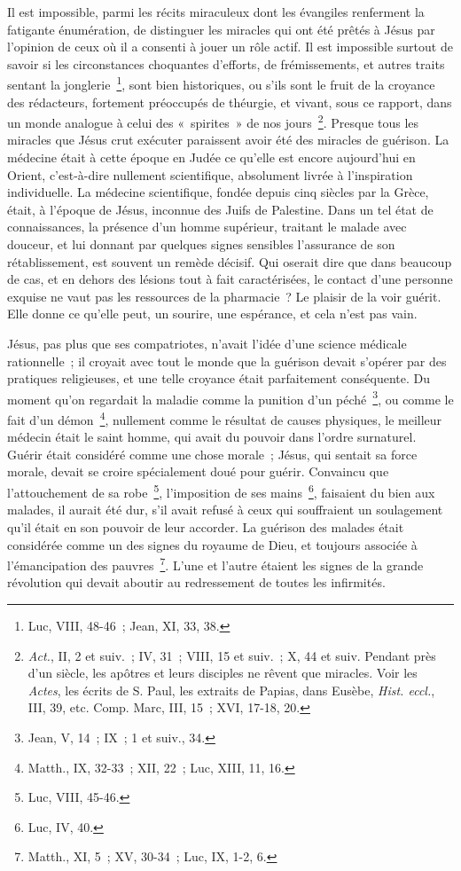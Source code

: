 \documentclass[french,twoside]{book} %
\begin{document}
Il est impossible, parmi les récits miraculeux dont les évangiles renferment la fatigante énumération, de distinguer les miracles qui ont été prêtés à Jésus par l’opinion de ceux où il a consenti à jouer un rôle actif. Il est impossible surtout de savoir si les circonstances choquantes d’efforts, de frémissements, et autres traits sentant la jonglerie \footnote{Luc, VIII, 48-46 ; Jean, XI, 33, 38.}, sont bien historiques, ou s’ils sont le fruit de la croyance des rédacteurs, fortement préoccupés de théurgie, et vivant, sous ce rapport, dans un monde analogue à celui des « spirites » de nos jours \footnote{{\itshape Act.}, II, 2 et suiv. ; IV, 31 ; VIII, 15 et suiv. ; X, 44 et suiv. Pendant près d’un siècle, les apôtres et leurs disciples ne rêvent que miracles. Voir les {\itshape Actes}, les écrits de S. Paul, les extraits de Papias, dans Eusèbe, {\itshape Hist. eccl.}, III, 39, etc. Comp. Marc, III, 15 ; XVI, 17-18, 20.}. Presque tous les miracles que Jésus crut exécuter paraissent avoir été des miracles de guérison. La médecine était à cette époque en Judée ce qu’elle est encore aujourd’hui en Orient, c’est-à-dire nullement scientifique, absolument livrée à l’inspiration individuelle. La médecine scientifique, fondée depuis cinq siècles par la Grèce, était, à l’époque de Jésus, inconnue des Juifs de Palestine. Dans un tel état de connaissances, la présence d’un homme supérieur, traitant le malade avec douceur, et lui donnant par quelques signes sensibles l’assurance de son rétablissement, est souvent un remède décisif. Qui oserait dire que dans beaucoup de cas, et en dehors des lésions tout à fait caractérisées, le contact d’une personne exquise ne vaut pas les ressources de la pharmacie ? Le plaisir de la voir guérit. Elle donne ce qu’elle peut, un sourire, une espérance, et cela n’est pas vain.\par
Jésus, pas plus que ses compatriotes, n’avait l’idée d’une science médicale rationnelle ; il croyait avec tout le monde que la guérison devait s’opérer par des pratiques religieuses, et une telle croyance était parfaitement conséquente. Du moment qu’on regardait la maladie comme la punition d’un péché \footnote{Jean, V, 14 ; IX ; 1 et suiv., 34.}, ou comme le fait d’un démon \footnote{Matth., IX, 32-33 ; XII, 22 ; Luc, XIII, 11, 16.}, nullement comme le résultat de causes physiques, le meilleur médecin était le saint homme, qui avait du pouvoir dans l’ordre surnaturel. Guérir était considéré comme une chose morale ; Jésus, qui sentait sa force morale, devait se croire spécialement doué pour guérir. Convaincu que l’attouchement de sa robe \footnote{Luc, VIII, 45-46.}, l’imposition de ses mains \footnote{Luc, IV, 40.}, faisaient du bien aux malades, il aurait été dur, s’il avait refusé à ceux qui souffraient un soulagement qu’il était en son pouvoir de leur accorder. La guérison des malades était considérée comme un des signes du royaume de Dieu, et toujours associée à l’émancipation des pauvres \footnote{Matth., XI, 5 ; XV, 30-34 ; Luc, IX, 1-2, 6.}. L’une et l’autre étaient les signes de la grande révolution qui devait aboutir au redressement de toutes les infirmités.\par
\end{document}
